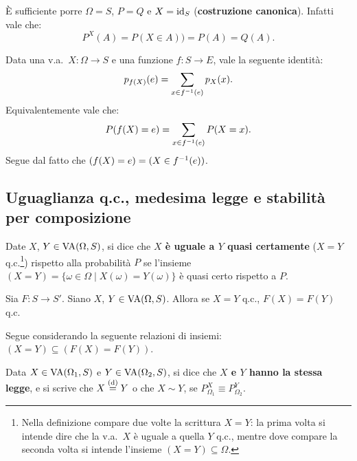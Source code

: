 \begin{multicols*}{2}
\begin{remark}
    È sufficiente porre $\Omega = S$, $P = Q$ e $X = \operatorname{id}_{S}$
    (\textbf{costruzione canonica}). Infatti vale che:
    \[
        P^X(A) = P(X \in A)) = P(A) = Q(A).
    \]
\end{remark}

\begin{proposition}
    Data una v.a.~$X : \Omega \to S$ e una funzione $f : S \to E$,
    vale la seguente identità:
    \[
        p_{f(X)}(e) = \sum_{x \in f^{-1}(e)} p_X(x).
    \]
    Equivalentemente vale che:
    \[
        P(f(X) = e) = \sum_{x \in f^{-1}(e)} P(X = x).
    \]
    Segue dal fatto che $(f(X) = e) = (X \in f^{-1}(e))$.
\end{proposition}

\subsection{Uguaglianza q.c., medesima legge e stabilità per composizione}

\begin{definition}
    Date $X$, $Y \in \operatorname{VA}(\Omega, S)$, si dice che
    \textbf{$X$ è uguale a $Y$ quasi certamente} ($X = Y$ q.c.\footnote{
        Nella definizione compare due volte la scrittura $X = Y$: la prima
        volta si intende dire che la v.a.~$X$ è uguale a quella $Y$ q.c.,
        mentre dove compare la seconda volta si intende l'insieme $(X=Y) \subseteq \Omega$.
    }) rispetto
    alla probabilità $P$ se
    l'insieme $(X = Y) = \{\omega \in \Omega \mid X(\omega) = Y(\omega)\}$
    è quasi certo rispetto a $P$.
\end{definition}

\begin{proposition}
    Sia $F : S \to S'$. Siano $X$, $Y \in \operatorname{VA}(\Omega, S)$. Allora se
    $X = Y$ q.c., $F(X) = F(Y)$ q.c. \smallskip

    Segue considerando la seguente relazioni di insiemi: $(X = Y) \subseteq (F(X) = F(Y))$.
\end{proposition}

\begin{definition}
    Data $X \in \operatorname{VA}(\Omega_1, S)$ e $Y \in \operatorname{VA}(\Omega_2, S)$,
    si dice che \textbf{$X$ e $Y$ hanno la stessa legge},
    e si scrive che $X \overset{\mathrm{(d)}}{=} Y$ o che $X \sim Y$, se
    $P_{\Omega_1}^X \equiv P_{\Omega_2}^Y$.
\end{definition}


\end{multicols*}
